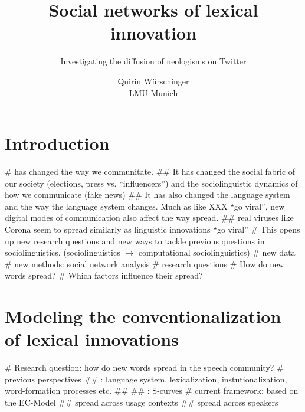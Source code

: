 \documentclass[
  a4paper,
  ]{scrartcl}
\begin{document}

  \title{Social networks of lexical innovation}
  \subtitle{Investigating the diffusion of neologisms on Twitter}
  \author{Quirin Würschinger\\ LMU Munich}
  \maketitle

\listoftodos

\tableofcontents


\section{Introduction}

  \begin{easylist}[itemize]
    #  has changed the way we communitate.
      ## It has changed the social fabric of our society (elections, press vs. \enquote{influencers}) and the sociolinguistic dynamics of how we communicate (fake news)
      ## It has also changed the language system and the way the language system changes. Much as  like XXX \enquote{go viral}, new digital modes of communication also affect the way  spread. 
      ## real viruses like Corona seem to spread similarly as linguistic innovations \enquote{go viral} \parencite{EandT2020}
    # This opens up new research questions and new ways to tackle previous questions in sociolinguistics. (sociolinguistics $\rightarrow$ computational sociolinguistics)
      # new data
      # new methods: social network analysis
    # research questions
      # How do new words spread?
      # Which factors influence their spread?
  \end{easylist}

\section{Modeling the conventionalization of lexical innovations}

  \begin{easylist}[itemize]
    # Research question: how do new words spread in the speech community?
    # previous perspectives
      ## : language system, lexicalization, instutionalization, word-formation processes etc. \cite{Bauer1983,Lipka2005}
      ##  \parencite{Schmid2008}
      ## : S-curves \parencite{Labov2007,Milroy1992}
    # current framework: based on the EC-Model \parencite{Schmid2020}
      ## spread across usage contexts
      ## spread across speakers
  \end{easylist}
\end{document}

